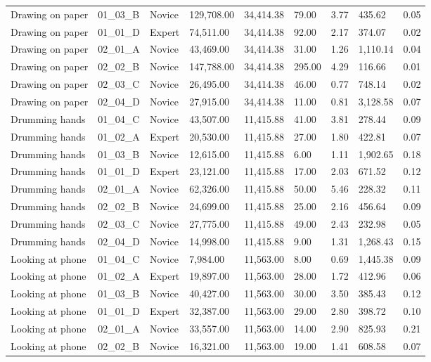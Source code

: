 \documentclass[
  english,
  man,floatsintext]{apa6}
\begin{document}
\begin{table}[h]
\begin{center}
\begin{threeparttable}
{\begin{tabular}{lllllllll}
Drawing on paper & 01\_03\_B & Novice & 129,708.00 & 34,414.38 & 79.00 & 3.77 & 435.62 & 0.05\\
Drawing on paper & 01\_01\_D & Expert & 74,511.00 & 34,414.38 & 92.00 & 2.17 & 374.07 & 0.02\\
Drawing on paper & 02\_01\_A & Novice & 43,469.00 & 34,414.38 & 31.00 & 1.26 & 1,110.14 & 0.04\\
Drawing on paper & 02\_02\_B & Novice & 147,788.00 & 34,414.38 & 295.00 & 4.29 & 116.66 & 0.01\\
Drawing on paper & 02\_03\_C & Novice & 26,495.00 & 34,414.38 & 46.00 & 0.77 & 748.14 & 0.02\\
Drawing on paper & 02\_04\_D & Novice & 27,915.00 & 34,414.38 & 11.00 & 0.81 & 3,128.58 & 0.07\\
Drumming hands & 01\_04\_C & Novice & 43,507.00 & 11,415.88 & 41.00 & 3.81 & 278.44 & 0.09\\
Drumming hands & 01\_02\_A & Expert & 20,530.00 & 11,415.88 & 27.00 & 1.80 & 422.81 & 0.07\\
Drumming hands & 01\_03\_B & Novice & 12,615.00 & 11,415.88 & 6.00 & 1.11 & 1,902.65 & 0.18\\
Drumming hands & 01\_01\_D & Expert & 23,121.00 & 11,415.88 & 17.00 & 2.03 & 671.52 & 0.12\\
Drumming hands & 02\_01\_A & Novice & 62,326.00 & 11,415.88 & 50.00 & 5.46 & 228.32 & 0.11\\
Drumming hands & 02\_02\_B & Novice & 24,699.00 & 11,415.88 & 25.00 & 2.16 & 456.64 & 0.09\\
Drumming hands & 02\_03\_C & Novice & 27,775.00 & 11,415.88 & 49.00 & 2.43 & 232.98 & 0.05\\
Drumming hands & 02\_04\_D & Novice & 14,998.00 & 11,415.88 & 9.00 & 1.31 & 1,268.43 & 0.15\\
Looking at phone & 01\_04\_C & Novice & 7,984.00 & 11,563.00 & 8.00 & 0.69 & 1,445.38 & 0.09\\
Looking at phone & 01\_02\_A & Expert & 19,897.00 & 11,563.00 & 28.00 & 1.72 & 412.96 & 0.06\\
Looking at phone & 01\_03\_B & Novice & 40,427.00 & 11,563.00 & 30.00 & 3.50 & 385.43 & 0.12\\
Looking at phone & 01\_01\_D & Expert & 32,387.00 & 11,563.00 & 29.00 & 2.80 & 398.72 & 0.10\\
Looking at phone & 02\_01\_A & Novice & 33,557.00 & 11,563.00 & 14.00 & 2.90 & 825.93 & 0.21\\
Looking at phone & 02\_02\_B & Novice & 16,321.00 & 11,563.00 & 19.00 & 1.41 & 608.58 & 0.07\\

\end{tabular}}
\end{threeparttable}
\end{center}
\end{table}
\end{document}
